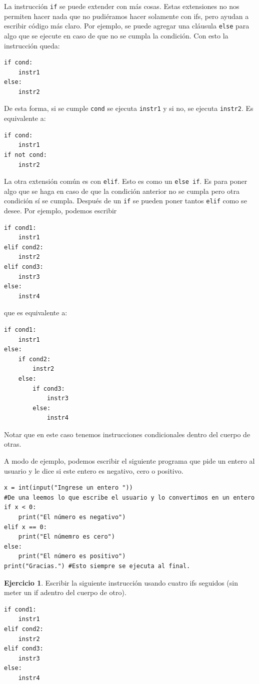 \documentclass[a4paper, 12pt]{report}
\theoremstyle{definition}
\newtheorem{ejercicio}{Ejercicio}[section]
\begin{document}
La instrucción {\tt if} se puede extender con más cosas. Estas extensiones no nos permiten hacer nada que no pudiéramos hacer solamente con ifs, pero ayudan a escribir código más claro. Por ejemplo, se puede agregar una cláusula {\tt else} para algo que se ejecute en caso de que no se cumpla la condición. Con esto la instrucción queda:
\begin{verbatim}
if cond:
    instr1
else:
    instr2
\end{verbatim}
De esta forma, si se cumple {\tt cond} se ejecuta {\tt instr1} y si no, se ejecuta {\tt instr2}. Es equivalente a:
\begin{verbatim}
if cond:
    instr1
if not cond:
    instr2
\end{verbatim}

La otra extensión común es con {\tt elif}. Esto es como un {\tt else if}. Es para poner algo que se haga en caso de que la condición anterior no se cumpla pero otra condición sí se cumpla. Después de un {\tt if} se pueden poner tantos {\tt elif} como se desee. Por ejemplo, podemos escribir
\begin{verbatim}
if cond1:
    instr1
elif cond2:
    instr2
elif cond3:
    instr3
else:
    instr4
\end{verbatim}
que es equivalente a:
\begin{verbatim}
if cond1:
    instr1
else:
    if cond2:
        instr2
    else:
        if cond3:
            instr3
        else:
            instr4
\end{verbatim}
Notar que en este caso tenemos instrucciones condicionales dentro del cuerpo de otras.

A modo de ejemplo, podemos escribir el siguiente programa que pide un entero al usuario y le dice si este entero es negativo, cero o positivo.
\begin{verbatim}
x = int(input("Ingrese un entero "))
#De una leemos lo que escribe el usuario y lo convertimos en un entero
if x < 0:
    print("El número es negativo")
elif x == 0:
    print("El númemro es cero")
else:
    print("El número es positivo")
print("Gracias.") #Esto siempre se ejecuta al final.
\end{verbatim}

\begin{ejercicio}
	Escribir la siguiente instrucción usando cuatro ifs seguidos (sin meter un if adentro del cuerpo de otro).
\begin{verbatim}
if cond1:
    instr1
elif cond2:
    instr2
elif cond3:
    instr3
else:
    instr4
\end{verbatim}

\end{ejercicio}
\end{document}
